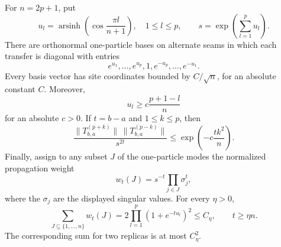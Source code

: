 \begin{lemma}\label{lem:spectrum}
For $n=2p+1$, put
\[
 u_l=\operatorname{arsinh}\!\left(\cos\frac{\pi l}{n+1}\right),
 \quad 1\le l\le p,
 \qquad s=\exp\!\left(\sum_{l=1}^p u_l\right).
\]
There are orthonormal one-particle bases on alternate seams in which
each transfer is diagonal with entries
\[
 e^{u_1},\ldots,e^{u_p},1,e^{-u_p},\ldots,e^{-u_1}.
\]
Every basis vector has site coordinates bounded by $C/\sqrt n$, for an
absolute constant $C$.  Moreover,
\begin{equation}\label{eq:mode-gap}
 u_l\ge c\frac{p+1-l}{n}
\end{equation}
for an absolute $c>0$.  If $t=b-a$ and $1\le k\le p$, then
\begin{equation}\label{eq:sector-penalty}
 \frac{\|T^{(p+k)}_{b,a}\|\,
             \|T^{(p-k)}_{b,a}\|}{s^{2t}}
 \le \exp\!\left(-c\frac{t k^2}{n}\right).
\end{equation}
Finally, assign to any subset $J$ of the one-particle modes the normalized
propagation weight
\[
 w_t(J)=s^{-t}\prod_{j\in J}\sigma_j^t,
\]
where the $\sigma_j$ are the displayed singular values.  For every
$\eta>0$,
\begin{equation}\label{eq:all-state-sum}
 \sum_{J\subseteq\{1,\ldots,n\}}w_t(J)
 =2\prod_{l=1}^p(1+e^{-t u_l})^2\le C_\eta,
 \qquad t\ge\eta n.
\end{equation}
The corresponding sum for two replicas is at most $C_\eta^2$.
\end{lemma}

